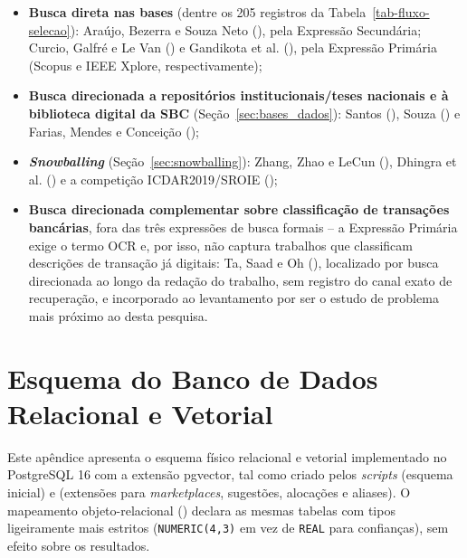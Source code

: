 \begin{apendicesenv}
\begin{itemize}
	\item \textbf{Busca direta nas bases} (dentre os 205 registros da Tabela~\ref{tab-fluxo-selecao}): Araújo, Bezerra e Souza Neto (\citeyear{araujo2024saneamento}), pela Expressão Secundária; Curcio, Galfré e Le Van (\citeyear{curcio2026safe}) e Gandikota et al. (\citeyear{gandikota2026spatial}), pela Expressão Primária (Scopus e IEEE Xplore, respectivamente);
	\item \textbf{Busca direcionada a repositórios institucionais/teses nacionais e à biblioteca digital da SBC} (Seção~\ref{sec:bases_dados}): Santos (\citeyear{santos2023classificacao}), Souza (\citeyear{souza2025extracao}) e Farias, Mendes e Conceição (\citeyear{farias2025notaconforme});
	\item \textbf{\textit{Snowballing}} (Seção~\ref{sec:snowballing}): Zhang, Zhao e LeCun (\citeyear{zhang2015character}), Dhingra et al. (\citeyear{dhingra2016tweet2vec}) e a competição ICDAR2019/SROIE (\citeyear{icdar2019competition});
	\item \textbf{Busca direcionada complementar sobre classificação de transações bancárias}, fora das três expressões de busca formais -- a Expressão Primária exige o termo OCR e, por isso, não captura trabalhos que classificam descrições de transação já digitais: Ta, Saad e Oh (\citeyear{ta2023specialized}), localizado por busca direcionada ao longo da redação do trabalho, sem registro do canal exato de recuperação, e incorporado ao levantamento por ser o estudo de problema mais próximo ao desta pesquisa.
\end{itemize}

\chapter{Esquema do Banco de Dados Relacional e Vetorial}
\label{apendice:esquema_banco}

Este apêndice apresenta o esquema físico relacional e vetorial implementado no PostgreSQL 16 com a extensão pgvector, tal como criado pelos \textit{scripts}  (esquema inicial) e  (extensões para \textit{marketplaces}, sugestões, alocações e aliases). O mapeamento objeto-relacional () declara as mesmas tabelas com tipos ligeiramente mais estritos (\texttt{NUMERIC(4,3)} em vez de \texttt{REAL} para confianças), sem efeito sobre os resultados.


\end{apendicesenv}
